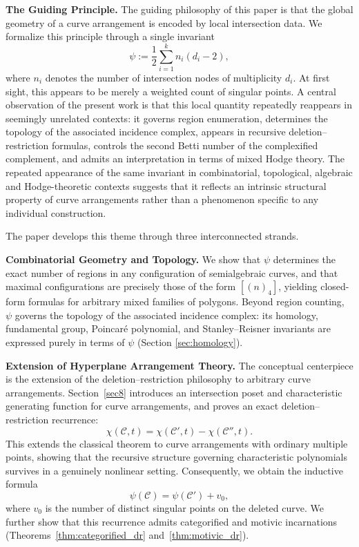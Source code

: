 \documentclass[article,11pt]{amsart} \numberwithin{equation}{section}
\numberwithin{equation}{section}
\begin{document}
{\medskip
\noindent\textbf{The Guiding Principle.}
The guiding philosophy of this paper is that the global geometry of a curve arrangement is encoded by local intersection data. We formalize this principle through a single invariant
\[
\psi:=\frac{1}{2}\sum_{i=1}^{k} n_i(d_i-2),
\]
where $n_i$ denotes the number of intersection nodes of multiplicity $d_i$. At first sight, this appears to be merely a weighted count of singular points. A central observation of the present work is that this local quantity repeatedly reappears in seemingly unrelated contexts: it governs region enumeration, determines the topology of the associated incidence complex, appears in recursive deletion--restriction formulas, controls the second Betti number of the complexified complement, and admits an interpretation in terms of mixed Hodge theory. The repeated appearance of the same invariant in combinatorial, topological, algebraic and Hodge-theoretic contexts suggests that it reflects an intrinsic structural property of curve arrangements rather than a phenomenon specific to any individual construction.

The paper develops this theme through three interconnected strands.

\medskip
\noindent\textbf{Combinatorial Geometry and Topology.} 
We show that $\psi$ determines the exact number of regions in any configuration of semialgebraic curves, and that maximal configurations are precisely those of the form $[(n)_4]$, yielding closed-form formulas for arbitrary mixed families of polygons. Beyond region counting, $\psi$ governs the topology of the associated incidence complex: its homology, fundamental group, Poincar\'e polynomial, and Stanley--Reisner invariants are expressed purely in terms of $\psi$ (Section \ref{sec:homology}).

\medskip
\noindent\textbf{Extension of Hyperplane Arrangement Theory.}
The conceptual centerpiece is the extension of the deletion--restriction philosophy to arbitrary curve arrangements. Section~\ref{sec8} introduces an intersection poset and characteristic generating function for curve arrangements, and proves an exact deletion--restriction recurrence:
\[
\chi(\mathcal C,t)=\chi(\mathcal C',t)-\chi(\mathcal C'',t).
\]
This extends the classical theorem to curve arrangements with ordinary multiple points, showing that the recursive structure governing characteristic polynomials survives in a genuinely nonlinear setting. Consequently, we obtain the inductive formula
\[
\psi(\mathcal C)=\psi(\mathcal C')+v_0,
\]
where $v_0$ is the number of distinct singular points on the deleted curve. We further show that this recurrence admits categorified and motivic incarnations (Theorems~\ref{thm:categorified_dr} and~\ref{thm:motivic_dr}). 

}
\end{document}

